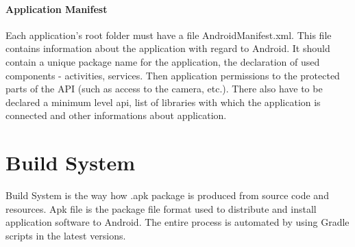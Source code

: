 \paragraph{Application Manifest} %
Each application's root folder must have a file AndroidManifest.xml. This file contains information about the application with regard to Android. It should contain a unique package name for the application, the declaration of used components - activities, services. Then application permissions to the protected parts of the API (such as access to the camera, etc.). There also have to be declared a minimum level api, list of libraries with which the application is connected and other informations about application.

\section{Build System}\label{buildProcess}
Build System is the way how .apk package is produced from source code and resources. Apk file is the package file format used to distribute and install application software to Android. The entire process is automated by using Gradle scripts in the latest versions.


